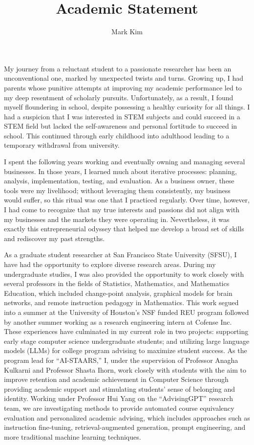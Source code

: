 \documentclass[12pt]{article}
\author{Mark Kim}
\title{Academic Statement}
\begin{document}
\maketitle
My journey from a reluctant student to a passionate researcher has been an unconventional one, marked by unexpected twists and
turns. Growing up, I had parents whose punitive attempts at improving my academic performance led to my deep resentment of scholarly
pursuits. Unfortunately, as a result, I found myself floundering in school, despite possessing a healthy curiosity for all things. I had a
suspicion that I was interested in STEM subjects and could succeed in a STEM field but lacked the self-awareness and personal fortitude to
succeed in school. This continued through early childhood into adulthood leading to a temporary withdrawal from university.

I spent the following years working and eventually owning and managing several businesses. In those years, I learned much about iterative
processes: planning, analysis, implementation, testing, and evaluation. As a business owner, these tools were my livelihood; without
leveraging them consistently, my business would suffer, so this ritual was one that I practiced regularly. Over time, however, I had come
to recognize that my true interests and passions did not align with my businesses and the markets they were operating in. Nevertheless, it
was exactly this entrepreneurial odyssey that helped me develop a broad set of skills and rediscover my past strengths.

As a graduate student researcher at San Francisco State University (SFSU), I have had the opportunity to explore diverse research areas.
During my undergraduate studies, I was also provided the opportunity to work closely with several professors in the fields of Statistics,
Mathematics, and Mathematics Education, which included change-point analysis, graphical models for brain networks, and remote instruction
pedagogy in Mathematics. This work segued into a summer at the University of Houston's NSF funded REU program followed by another summer
working as a research engineering intern at Cofense Inc. These experiences have culminated in my current role in two projects: supporting
early stage computer science undergraduate students; and utilizing large language models (LLMs) for college program advising to maximize
student success. As the program lead for ``AI-STAARS,'' I, under the supervision of Professor Anagha Kulkarni and Professor Shasta Ihorn,
work closely with students with the aim to improve retention and academic achievement in Computer Science through providing academic support
and stimulating students' sense of belonging and identity. Working under Professor Hui Yang on the ``AdvisingGPT'' research team, we are
investigating methods to provide automated course equivalency evaluation and personalized academic advising, which includes approaches such
as instruction fine-tuning, retrieval-augmented generation, prompt engineering, and more traditional machine learning techniques.
\end{document}

